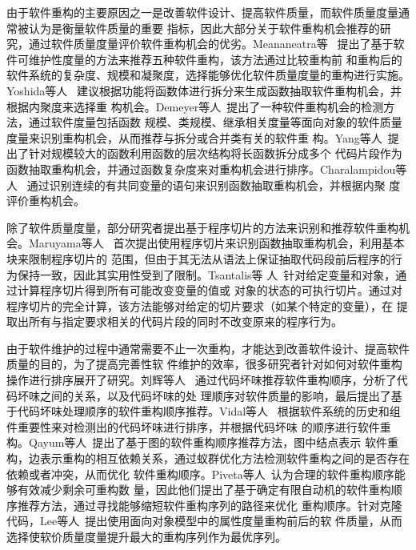 由于软件重构的主要原因之一是改善软件设计、提高软件质量，而软件质量度量通常被认为是衡量软件质量的重要
指标，因此大部分关于软件重构机会推荐的研究，通过软件质量度量评价软件重构机会的优劣。Meananeatra等
~\cite{meananeatra2011using}提出了基于软件可维护性度量的方法来推荐五种软件重构，该方法通过比较重构前
和重构后的软件系统的复杂度、规模和凝聚度，选择能够优化软件质量度量的重构进行实施。Yoshida等人
~\cite{yoshida2012cohesion}建议根据功能将函数体进行拆分来生成函数抽取软件重构机会，并根据内聚度来选择重
构机会。Demeyer等人~\cite{demeyer2000finding}提出了一种软件重构机会的检测方法，通过软件度量包括函数
规模、类规模、继承相关度量等面向对象的软件质量度量来识别重构机会，从而推荐与拆分或合并类有关的软件重
构。Yang等人~\cite{yang2009identifying}提出了针对规模较大的函数利用函数的层次结构将长函数拆分成多个
代码片段作为函数抽取重构机会，并通过函数复杂度来对重构机会进行排序。Charalampidou等人
~\cite{charalampidou2016identifying}通过识别连续的有共同变量的语句来识别函数抽取重构机会，并根据内聚
度评价重构机会。

除了软件质量度量，部分研究者提出基于程序切片的方法来识别和推荐软件重构机会。Maruyama等人
~\cite{maruyama2001automated}首次提出使用程序切片来识别函数抽取重构机会，利用基本块来限制程序切片的
范围，但由于其无法从语法上保证抽取代码段前后程序的行为保持一致，因此其实用性受到了限制。Tsantalis等
人~\cite{tsantalis2011identification}针对给定变量和对象，通过计算程序切片得到所有可能改变变量的值或
对象的状态的可执行切片。通过对程序切片的完全计算，该方法能够对给定的切片要求（如某个特定的变量），在
提取出所有与指定要求相关的代码片段的同时不改变原来的程序行为。

由于软件维护的过程中通常需要不止一次重构，才能达到改善软件设计、提高软件质量的目的，为了提高完善性软
件维护的效率，很多研究者针对如何对软件重构操作进行排序展开了研究。刘辉等人
~\cite{liu2009facilitating}通过代码坏味推荐软件重构顺序，分析了代码坏味之间的关系，以及代码坏味的处
理顺序对软件质量的影响，最后提出了基于代码坏味处理顺序的软件重构顺序推荐。Vidal等人
~\cite{vidal2016approach}根据软件系统的历史和组件重要性来对检测出的代码坏味进行排序，并根据代码坏味
的顺序进行软件重构。Qayum等人~\cite{qayum2009local}提出了基于图的软件重构顺序推荐方法，图中结点表示
软件重构，边表示重构的相互依赖关系，通过蚁群优化方法检测软件重构之间的是否存在依赖或者冲突，从而优化
软件重构顺序。Piveta等人~\cite{piveta2008searching}认为合理的软件重构顺序能够有效减少剩余可重构数
量，因此他们提出了基于确定有限自动机的软件重构顺序推荐方法，通过寻找能够缩短软件重构序列的路径来优化
重构顺序。针对克隆代码，Lee等人~\cite{lee2011automated}提出使用面向对象模型中的属性度量重构前后的软
件质量，从而选择使软价质量度量提升最大的重构序列作为最优序列。
